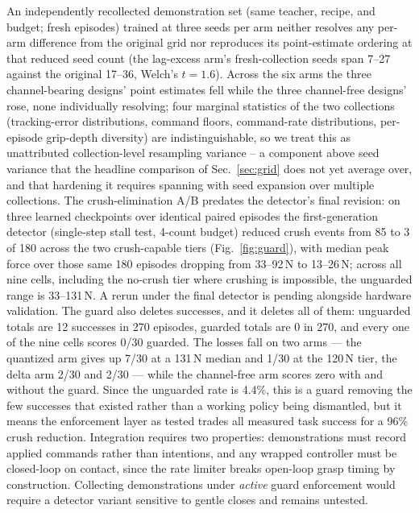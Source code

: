 \documentclass{article}
\begin{document}
An independently recollected demonstration set (same teacher, recipe, and
budget; fresh episodes) trained at three seeds per arm neither resolves
any per-arm difference from the original grid nor reproduces its
point-estimate ordering at that reduced seed count (the lag-excess arm's
fresh-collection seeds span 7--27 against the original 17--36, Welch's
$t = 1.6$). Across the six arms the three channel-bearing designs' point
estimates fell while the three channel-free designs' rose, none
individually resolving; four marginal statistics of the two collections
(tracking-error distributions, command floors, command-rate
distributions, per-episode grip-depth diversity) are indistinguishable,
so we treat this as unattributed collection-level resampling variance --
a component above seed variance that the headline comparison of
Sec.~\ref{sec:grid} does not yet average over, and that hardening it
requires spanning with seed expansion over multiple collections.
The crush-elimination A/B predates the detector's final revision: on
three learned checkpoints over identical paired episodes the
first-generation detector (single-step stall test, 4-count budget)
reduced crush events from 85 to 3 of 180 across the two crush-capable
tiers (Fig.~\ref{fig:guard}), with median peak force over those same 180
episodes dropping from 33--92\,N to 13--26\,N; across all nine cells,
including the no-crush tier where crushing is impossible, the unguarded
range is 33--131\,N. A rerun under the final detector is pending
alongside hardware validation. The guard also deletes successes, and it
deletes all of them: unguarded totals are 12 successes in 270 episodes,
guarded totals are 0 in 270, and every one of the nine cells scores
0/30 guarded. The losses fall on two arms --- the quantized arm gives up
7/30 at a 131\,N median and 1/30 at the 120\,N tier, the delta arm 2/30
and 2/30 --- while the channel-free arm scores zero with and without the
guard. Since the unguarded rate is 4.4\%, this is a guard removing the
few successes that existed rather than a working policy being
dismantled, but it means the enforcement layer as tested trades all
measured task success for a 96\% crush reduction. Integration requires two
properties: demonstrations must record applied commands rather than
intentions, and any wrapped controller must be closed-loop on contact,
since the rate limiter breaks open-loop grasp timing by construction.
Collecting demonstrations under \emph{active} guard enforcement would
require a detector variant sensitive to gentle closes and remains
untested.
\end{document}

